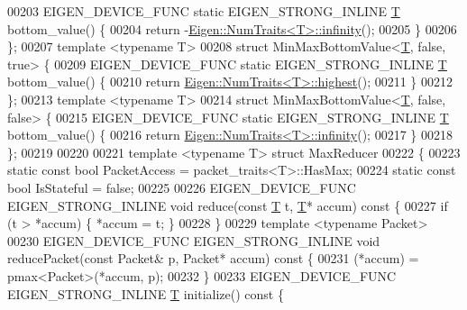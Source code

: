 \begin{DoxyCode}
00203   EIGEN\_DEVICE\_FUNC \textcolor{keyword}{static} EIGEN\_STRONG\_INLINE \hyperlink{group___sparse_core___module_class_eigen_1_1_triplet}{T} bottom\_value() \{
00204     \textcolor{keywordflow}{return} -\hyperlink{group___core___module_struct_eigen_1_1_num_traits}{Eigen::NumTraits<T>::infinity}();
00205   \}
00206 \};
00207 \textcolor{keyword}{template} <\textcolor{keyword}{typename} T>
00208 \textcolor{keyword}{struct }MinMaxBottomValue<\hyperlink{group___sparse_core___module_class_eigen_1_1_triplet}{T}, false, true> \{
00209   EIGEN\_DEVICE\_FUNC \textcolor{keyword}{static} EIGEN\_STRONG\_INLINE \hyperlink{group___sparse_core___module_class_eigen_1_1_triplet}{T} bottom\_value() \{
00210     \textcolor{keywordflow}{return} \hyperlink{group___core___module_struct_eigen_1_1_num_traits}{Eigen::NumTraits<T>::highest}();
00211   \}
00212 \};
00213 \textcolor{keyword}{template} <\textcolor{keyword}{typename} T>
00214 \textcolor{keyword}{struct }MinMaxBottomValue<\hyperlink{group___sparse_core___module_class_eigen_1_1_triplet}{T}, false, false> \{
00215   EIGEN\_DEVICE\_FUNC \textcolor{keyword}{static} EIGEN\_STRONG\_INLINE \hyperlink{group___sparse_core___module_class_eigen_1_1_triplet}{T} bottom\_value() \{
00216     \textcolor{keywordflow}{return} \hyperlink{group___core___module_struct_eigen_1_1_num_traits}{Eigen::NumTraits<T>::infinity}();
00217   \}
00218 \};
00219 
00220 
00221 \textcolor{keyword}{template} <\textcolor{keyword}{typename} T> \textcolor{keyword}{struct }MaxReducer
00222 \{
00223   \textcolor{keyword}{static} \textcolor{keyword}{const} \textcolor{keywordtype}{bool} PacketAccess = packet\_traits<T>::HasMax;
00224   \textcolor{keyword}{static} \textcolor{keyword}{const} \textcolor{keywordtype}{bool} IsStateful = \textcolor{keyword}{false};
00225 
00226   EIGEN\_DEVICE\_FUNC EIGEN\_STRONG\_INLINE \textcolor{keywordtype}{void} reduce(\textcolor{keyword}{const} \hyperlink{group___sparse_core___module_class_eigen_1_1_triplet}{T} t, \hyperlink{group___sparse_core___module_class_eigen_1_1_triplet}{T}* accum)\textcolor{keyword}{ const }\{
00227     \textcolor{keywordflow}{if} (t > *accum) \{ *accum = t; \}
00228   \}
00229   \textcolor{keyword}{template} <\textcolor{keyword}{typename} Packet>
00230   EIGEN\_DEVICE\_FUNC EIGEN\_STRONG\_INLINE \textcolor{keywordtype}{void} reducePacket(\textcolor{keyword}{const} Packet& p, Packet* accum)\textcolor{keyword}{ const }\{
00231     (*accum) = pmax<Packet>(*accum, p);
00232   \}
00233   EIGEN\_DEVICE\_FUNC EIGEN\_STRONG\_INLINE \hyperlink{group___sparse_core___module_class_eigen_1_1_triplet}{T} initialize()\textcolor{keyword}{ const }\{

\end{DoxyCode}
